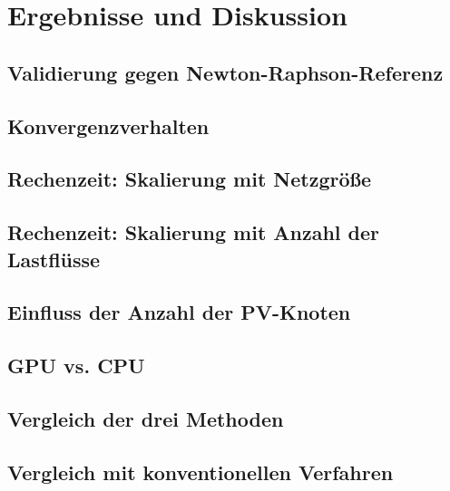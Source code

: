 \chapter{Ergebnisse und Diskussion}
\label{ch:ergebnisse}

\section{Validierung gegen Newton-Raphson-Referenz}
\label{sec:validierung}

\section{Konvergenzverhalten}
\label{sec:konvergenz}

\section{Rechenzeit: Skalierung mit Netzgröße}
\label{sec:skalierung_netz}

\section{Rechenzeit: Skalierung mit Anzahl der Lastflüsse}
\label{sec:skalierung_tau}

\section{Einfluss der Anzahl der PV-Knoten}
\label{sec:einfluss_npv}

\section{GPU vs. CPU}
\label{sec:gpu_cpu}

\section{Vergleich der drei Methoden}
\label{sec:vergleich_methoden}

\section{Vergleich mit konventionellen Verfahren}
\label{sec:vergleich_konventionell}
